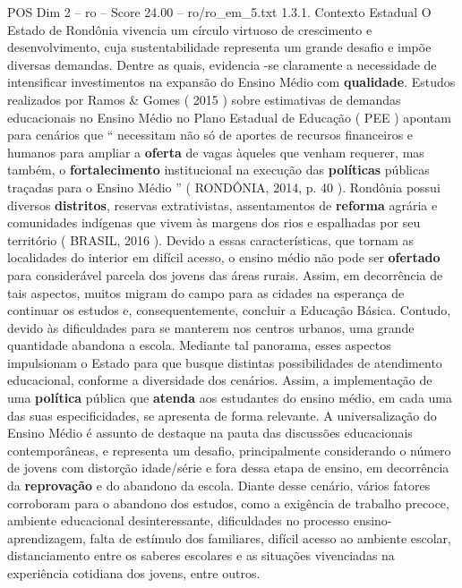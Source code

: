 \begin{textsample}{POS Dim 2 – ro – Score 24.00 – ro/ro\_em\_5.txt}  \label{ex:f2_pos_189}
1.3.1.
Contexto Estadual O Estado de Rondônia vivencia um círculo virtuoso de crescimento e desenvolvimento, cuja sustentabilidade representa um grande desafio e impõe diversas demandas.
Dentre as quais, evidencia -se claramente a necessidade de intensificar investimentos na expansão do Ensino Médio com \textbf{qualidade}.
Estudos realizados por Ramos \& Gomes ( 2015 ) sobre estimativas de demandas educacionais no Ensino Médio no Plano Estadual de Educação ( PEE ) apontam para cenários que “ necessitam não só de aportes de recursos financeiros e humanos para ampliar a \textbf{oferta} de vagas àqueles que venham requerer, mas também, o \textbf{fortalecimento} institucional na execução das \textbf{políticas} públicas traçadas para o Ensino Médio ” ( RONDÔNIA, 2014, p. 40 ).
Rondônia possui diversos \textbf{distritos}, reservas extrativistas, assentamentos de \textbf{reforma} agrária e comunidades indígenas que vivem às margens dos rios e espalhadas por seu território ( BRASIL, 2016 ).
Devido a essas características, que tornam as localidades do interior em difícil acesso, o ensino médio não pode ser \textbf{ofertado} para considerável parcela dos jovens das áreas rurais.
Assim, em decorrência de tais aspectos, muitos migram do campo para as cidades na esperança de continuar os estudos e, consequentemente, concluir a Educação Básica.
Contudo, devido às dificuldades para se manterem nos centros urbanos, uma grande quantidade abandona a escola.
Mediante tal panorama, esses aspectos impulsionam o Estado para que busque distintas possibilidades de atendimento educacional, conforme a diversidade dos cenários.
Assim, a implementação de uma \textbf{política} pública que \textbf{atenda} aos estudantes do ensino médio, em cada uma das suas especificidades, se apresenta de forma relevante.
A universalização do Ensino Médio é assunto de destaque na pauta das discussões educacionais contemporâneas, e representa um desafio, principalmente considerando o número de jovens com distorção idade/série e fora dessa etapa de ensino, em decorrência da \textbf{reprovação} e do abandono da escola.
Diante desse cenário, vários fatores corroboram para o abandono dos estudos, como a exigência de trabalho precoce, ambiente educacional desinteressante, dificuldades no processo ensino-aprendizagem, falta de estímulo dos familiares, difícil acesso ao ambiente escolar, distanciamento entre os saberes escolares e as situações vivenciadas na experiência cotidiana dos jovens, entre outros.

\end{textsample}
